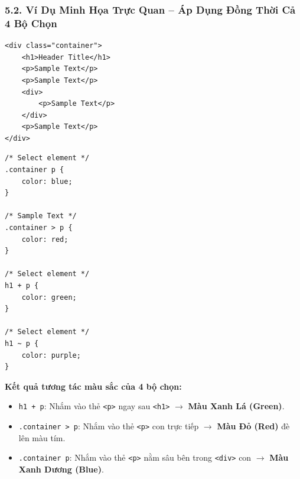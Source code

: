 \documentclass[11pt,oneside]{book}
\newcommand{\codeinline}[1]{\textcolor{accentOrange}{\texttt{#1}}}
\begin{document}
\subsubsection{5.2. Ví Dụ Minh Họa Trực Quan -- Áp Dụng Đồng Thời Cả 4 Bộ Chọn}

\begin{codeWindow}
\begin{lstlisting}[language=HTML5]
<div class="container">
    <h1>Header Title</h1>
    <p>Sample Text</p>
    <p>Sample Text</p>
    <div>
        <p>Sample Text</p>
    </div>
    <p>Sample Text</p>
</div>
\end{lstlisting}
\end{codeWindow}

\begin{codeWindow}
\begin{lstlisting}[language=CSS3]
/* Select element */
.container p {
    color: blue;
}

/* Sample Text */
.container > p {
    color: red;
}

/* Select element */
h1 + p {
    color: green;
}

/* Select element */
h1 ~ p {
    color: purple;
}
\end{lstlisting}
\end{codeWindow}

\begin{browserWindow}
\begin{tcolorbox}[arc=4pt, colback=white, colframe=primaryBlue!30, boxrule=0.8pt, top=10pt, bottom=10pt, left=12pt, right=12pt]
  {\sffamily\bfseries\color{primaryBlue} Kết quả tương tác màu sắc của 4 bộ chọn:}\par\vspace{6pt}
  \begin{itemize}[leftmargin=1.2em, itemsep=3pt, parsep=0pt]
    \item \codeinline{h1 + p}: Nhắm vào thẻ \codeinline{<p>} ngay sau \codeinline{<h1>} $\rightarrow$ \textbf{\color{green!70!black}Màu Xanh Lá (Green)}.
    \item \codeinline{.container > p}: Nhắm vào thẻ \codeinline{<p>} con trực tiếp $\rightarrow$ \textbf{\color{red!80!black}Màu Đỏ (Red)} đè lên màu tím.
    \item \codeinline{.container p}: Nhắm vào thẻ \codeinline{<p>} nằm sâu bên trong \codeinline{<div>} con $\rightarrow$ \textbf{\color{blue}Màu Xanh Dương (Blue)}.
  \end{itemize}
\end{tcolorbox}
\end{browserWindow}
\end{document}

